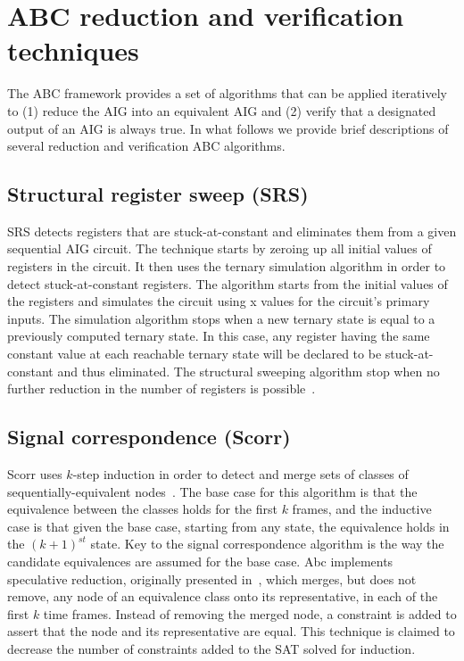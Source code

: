 \section{ABC reduction and verification techniques}
\label{app:abc}

The ABC framework provides a set of algorithms that can 
be applied iteratively to (1) reduce the AIG into 
an equivalent AIG and (2) verify that a designated 
output of an AIG is always true. 
In what follows we provide brief descriptions of several 
reduction and verification ABC algorithms. 

\subsection{Structural register sweep (SRS)}
SRS detects registers that are stuck-at-constant and eliminates 
them from a given sequential AIG circuit. The technique starts by zeroing up all 
initial values of registers in the circuit. It then uses the ternary simulation
algorithm in order to detect stuck-at-constant registers. The algorithm starts from 
the initial values of the registers and simulates the circuit using x values for the
circuit's primary inputs. The simulation algorithm stops when a new ternary state is 
equal to a previously computed ternary state. In this case, any register having the 
same constant value at each reachable ternary state will be declared to be 
stuck-at-constant and thus eliminated. The structural sweeping algorithm stop when 
no further reduction in the number of registers is possible~\cite{mishchenko2008scalable}. 

\subsection{Signal correspondence (Scorr)} 
Scorr uses $k$-step induction in order to detect and merge sets of classes of 
sequentially-equivalent nodes~\cite{mishchenko2008scalable}. The base case for this algorithm is that the equivalence
between the classes holds for the first $k$ frames, and the inductive case is that 
given the base case, starting from any state, the equivalence holds in the 
$(k+1)^{st}$ state. Key to the signal correspondence algorithm is the way the candidate
equivalences are assumed for the base case. Abc implements speculative reduction, 
originally presented in~\cite{mony2005exploiting}, which merges, but does not remove, any node of an equivalence 
class onto its representative, in each of the first $k$ time frames. Instead of removing the 
merged node, a constraint is added to assert that the node and its representative are equal. 
This technique is claimed to decrease the number of constraints added to the SAT solved for 
induction. 

